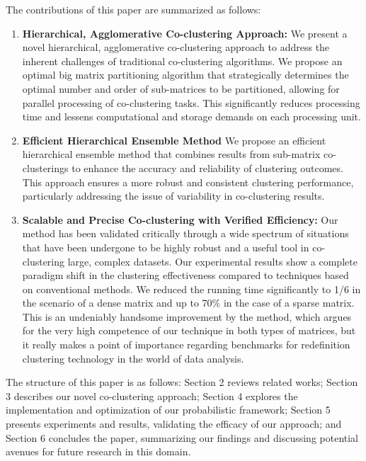 The contributions of this paper are summarized as follows:
\begin{enumerate}
    \item \textbf{Hierarchical, Agglomerative Co-clustering Approach: }We present a novel hierarchical, agglomerative co-clustering approach to address the inherent challenges of traditional co-clustering algorithms. We propose an optimal big matrix partitioning algorithm that strategically determines the optimal number and order of sub-matrices to be partitioned, allowing for parallel processing of co-clustering tasks. This significantly reduces processing time and lessens computational and storage demands on each processing unit.
    \item \textbf{Efficient Hierarchical Ensemble Method} We propose an efficient hierarchical ensemble method that combines results from sub-matrix co-clusterings to enhance the accuracy and reliability of clustering outcomes. This approach ensures a more robust and consistent clustering performance, particularly addressing the issue of variability in co-clustering results.
    \item \textbf{Scalable and Precise Co-clustering with Verified Efficiency: } Our method has been validated critically through a wide spectrum of situations that have been undergone to be highly robust and a useful tool in co-clustering large, complex datasets. Our experimental results show a complete paradigm shift in the clustering effectiveness compared to techniques based on conventional methods. 
    We reduced the running time significantly to 1/6 in the scenario of a dense matrix and up to 70\% in the case of a sparse matrix.
    This is an undeniably handsome improvement by the method, which argues for the very high competence of our technique in both types of matrices, but it really makes a point of importance regarding benchmarks for redefinition clustering technology in the world of data analysis. 
\end{enumerate}

The structure of this paper is as follows: Section 2 reviews related works; Section 3 describes our novel co-clustering approach; Section 4 explores the implementation and optimization of our probabilistic framework; Section 5 presents experiments and results, validating the efficacy of our approach; and Section 6 concludes the paper, summarizing our findings and discussing potential avenues for future research in this domain.
 